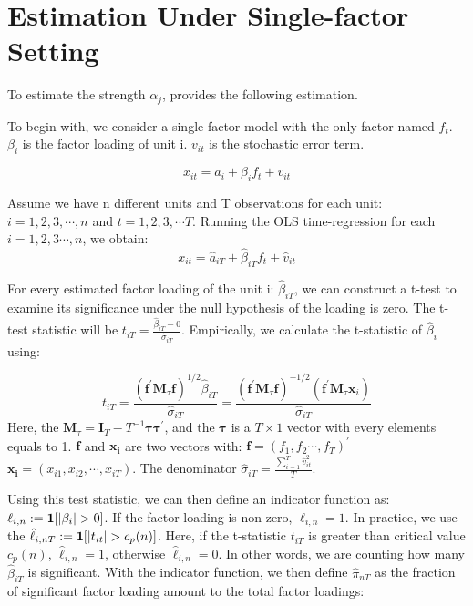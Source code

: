 	\section{Estimation Under Single-factor Setting}\label{strength_one_factor_estimation}
To estimate the strength $\alpha_j$,  provides the following estimation.

To begin with, we consider a single-factor model with the only factor named $f_t$. 
 $\beta_{i}$ is the factor loading of unit i.
$v_{it}$ is the stochastic error term.

\[  x_{it} = a_{i} +  \beta_{i}f_{t} + v_{it} \tag{2} \label{estimation_model}\]

Assume we have n different units and T observations for each unit: $i = 1, 2, 3, \cdots, n$ and $t = 1,2,3, \cdots T$.
Running the OLS time-regression for each $i = 1,2,3\cdots, n$, we obtain:
\[   x_{it} = \hat{a}_{iT} +  \hat{\beta}_{iT}f_{t} + \hat{v}_{it}  \]

For every estimated factor loading of the unit i:  $\hat{\beta}_{iT}$, we can construct a t-test to examine its significance under the null hypothesis of the loading is zero.
The t-test statistic will be $t_{iT} = \frac{\hat{\beta}_{iT} - 0}{\hat{\sigma}_{iT}}$.  
Empirically, we calculate the t-statistic of $\hat{\beta}_i$ using:

\[t_{i T}=\frac{\left(\bm{f}^{\prime} \bm{M}_{\tau} \bm{f}\right)^{1 / 2} \hat{\beta}_{i T}}{\hat{\sigma}_{i T}}=\frac{\left(\bm{f}^{\prime} \bm{M}_{\tau} \bm{f}\right)^{-1 / 2}\left(\bm{f}^{\prime} \bm{M}_{\tau} \bm{x}_{i}\right)}{\hat{\sigma}_{i T}} \tag{3} \label{test_statistic} \]
Here, the $\bm{M}_{\tau} = \bm{I}_T - T^{-1}\bm{\tau}\bm{\tau^\prime}$, and the $\bm{\tau}$ is a $T\times 1$ vector with every elements equals to 1.
$\bm{f}$ and $\bm{x_i}$ are two vectors with: $\bm{f} = (f_1, f_2 \cdots, f_T)^{\prime}$   $\bm{x_i} = (x_{i1}, x_{i2}, \cdots, x_{iT})$.
The denominator $\hat{\sigma}_{iT} = \frac{\sum_{i=1}^{T} \hat{v}^2_{it} }{T}$.

Using this test statistic, we can then define an indicator function as: $\ell_{i,n} := {\bf1}[|\beta_i|>0]$.
If the factor loading is non-zero, $\ell_{i,n} = 1$.
In practice, we use the $\hat{\ell}_{i,nT} := {\bf1}[|t_{it}|>c_p(n)]$.
Here, if the t-statistic $t_{iT}$ is greater than critical value $c_p(n)$,  $\hat{\ell}_{i,n} = 1$, otherwise $\hat{\ell}_{i,n} = 0$.
In other words, we are counting how many $\hat{\beta}_{iT}$ is significant.
With the indicator function, we then define $\hat{\pi}_{nT}$ as the fraction of significant factor loading amount to the total factor loadings:

